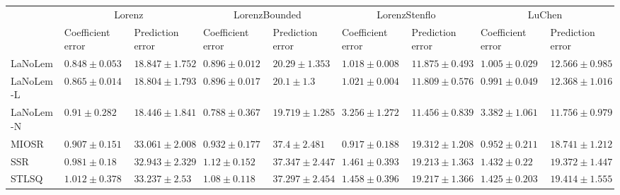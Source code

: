 \begin{table*}
{\begin{tabular}{lllllllll}
 & \multicolumn{2}{c}{Lorenz} & \multicolumn{2}{c}{LorenzBounded} & \multicolumn{2}{c}{LorenzStenflo} & \multicolumn{2}{c}{LuChen} \\
 & Coefficient error & Prediction error & Coefficient error & Prediction error & Coefficient error & Prediction error & Coefficient error & Prediction error \\
\midrule
LaNoLem & $\mathbf{0.848}\pm 0.053$ & $18.847\pm 1.752$ & $0.896\pm 0.012$ & $20.29\pm 1.353$ & $1.018\pm 0.008$ & $11.875\pm 0.493$ & $1.005\pm 0.029$ & $12.566\pm 0.985$ \\
LaNoLem-L & $0.865\pm 0.014$ & $18.804\pm 1.793$ & $0.896\pm 0.017$ & $20.1\pm 1.3$ & $1.021\pm 0.004$ & $11.809\pm 0.576$ & $0.991\pm 0.049$ & $12.368\pm 1.016$ \\
LaNoLem-N & $0.91\pm 0.282$ & $\mathbf{18.446}\pm 1.841$ & $\mathbf{0.788}\pm 0.367$ & $\mathbf{19.719}\pm 1.285$ & $3.256\pm 1.272$ & $\mathbf{11.456}\pm 0.839$ & $3.382\pm 1.061$ & $\mathbf{11.756}\pm 0.979$ \\
MIOSR & $0.907\pm 0.151$ & $33.061\pm 2.008$ & $0.932\pm 0.177$ & $37.4\pm 2.481$ & $\mathbf{0.917}\pm 0.188$ & $19.312\pm 1.208$ & $\mathbf{0.952}\pm 0.211$ & $18.741\pm 1.212$ \\
SSR & $0.981\pm 0.18$ & $32.943\pm 2.329$ & $1.12\pm 0.152$ & $37.347\pm 2.447$ & $1.461\pm 0.393$ & $19.213\pm 1.363$ & $1.432\pm 0.22$ & $19.372\pm 1.447$ \\
STLSQ & $1.012\pm 0.378$ & $33.237\pm 2.53$ & $1.08\pm 0.118$ & $37.297\pm 2.454$ & $1.458\pm 0.396$ & $19.217\pm 1.366$ & $1.425\pm 0.203$ & $19.414\pm 1.555$ \\

\midrule


\end{tabular}}
\end{table*}
